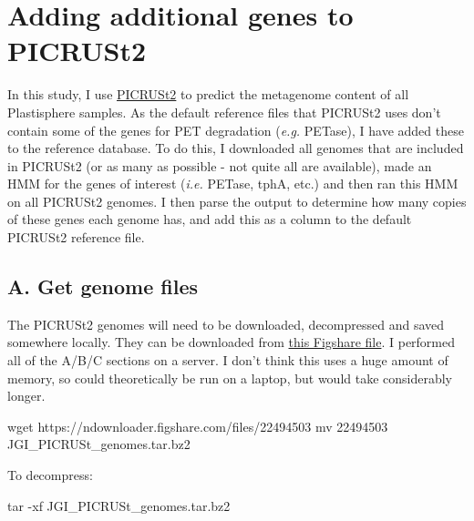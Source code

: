 \documentclass[
]{article}
\newenvironment{Shaded}{\begin{snugshade}}{\end{snugshade}}
\newcommand{\FunctionTok}[1]{\textcolor[rgb]{0.00,0.00,0.00}{#1}}
\newcommand{\NormalTok}[1]{#1}
\begin{document}
\hypertarget{adding-additional-genes-to-picrust2}{%
\section{Adding additional genes to
PICRUSt2}\label{adding-additional-genes-to-picrust2}}

In this study, I use
\href{https://github.com/picrust/picrust2/wiki}{PICRUSt2} to predict the
metagenome content of all Plastisphere samples. As the default reference
files that PICRUSt2 uses don't contain some of the genes for PET
degradation (\emph{e.g.} PETase), I have added these to the reference
database. To do this, I downloaded all genomes that are included in
PICRUSt2 (or as many as possible - not quite all are available), made an
HMM for the genes of interest (\emph{i.e.} PETase, tphA, etc.) and then
ran this HMM on all PICRUSt2 genomes. I then parse the output to
determine how many copies of these genes each genome has, and add this
as a column to the default PICRUSt2 reference file.

\hypertarget{section}{%
\subsection{}\label{section}}

\hypertarget{a.-get-genome-files}{%
\subsection{A. Get genome files}\label{a.-get-genome-files}}

The PICRUSt2 genomes will need to be downloaded, decompressed and saved
somewhere locally. They can be downloaded from
\href{https://doi.org/10.6084/m9.figshare.12233192}{this Figshare file}.
I performed all of the A/B/C sections on a server. I don't think this
uses a huge amount of memory, so could theoretically be run on a laptop,
but would take considerably longer.

\begin{Shaded}
\begin{Highlighting}[]
\FunctionTok{wget}\NormalTok{ https://ndownloader.figshare.com/files/22494503}
\FunctionTok{mv}\NormalTok{ 22494503 JGI_PICRUSt_genomes.tar.bz2}
\end{Highlighting}
\end{Shaded}

To decompress:

\begin{Shaded}
\begin{Highlighting}[]
\FunctionTok{tar}\NormalTok{ -xf JGI_PICRUSt_genomes.tar.bz2}
\end{Highlighting}
\end{Shaded}
\end{document}
